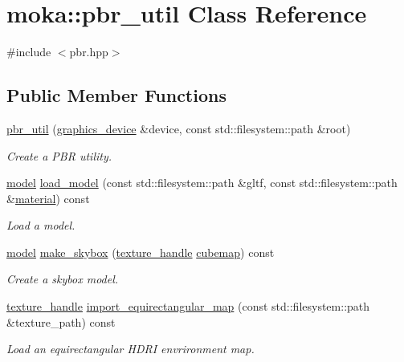 \hypertarget{classmoka_1_1pbr__util}{}\section{moka\+::pbr\+\_\+util Class Reference}
\label{classmoka_1_1pbr__util}


{\ttfamily \#include $<$pbr.\+hpp$>$}

\subsection*{Public Member Functions}
\begin{DoxyCompactItemize}
\item 
\mbox{\hyperlink{classmoka_1_1pbr__util_a2acd5e0c0e065f52e622d6e54cc6db65}{pbr\+\_\+util}} (\mbox{\hyperlink{classmoka_1_1graphics__device}{graphics\+\_\+device}} \&device, const std\+::filesystem\+::path \&root)
\begin{DoxyCompactList}\small\item\em Create a P\+BR utility. \end{DoxyCompactList}\item 
\mbox{\hyperlink{classmoka_1_1model}{model}} \mbox{\hyperlink{classmoka_1_1pbr__util_a6284a2bd80b2007a9bd057cf809998c5}{load\+\_\+model}} (const std\+::filesystem\+::path \&gltf, const std\+::filesystem\+::path \&\mbox{\hyperlink{classmoka_1_1material}{material}}) const
\begin{DoxyCompactList}\small\item\em Load a model. \end{DoxyCompactList}\item 
\mbox{\hyperlink{classmoka_1_1model}{model}} \mbox{\hyperlink{classmoka_1_1pbr__util_ae7e38f3efe0bc1b3f48e21b379d0750d}{make\+\_\+skybox}} (\mbox{\hyperlink{structmoka_1_1texture__handle}{texture\+\_\+handle}} \mbox{\hyperlink{namespacemoka_a259bf395c8f07bd8d13515efcb542623a63469dd37fd256264ad46c84e2ff6986}{cubemap}}) const
\begin{DoxyCompactList}\small\item\em Create a skybox model. \end{DoxyCompactList}\item 
\mbox{\hyperlink{structmoka_1_1texture__handle}{texture\+\_\+handle}} \mbox{\hyperlink{classmoka_1_1pbr__util_a108ca0e7337f7282e6928c133c0d2315}{import\+\_\+equirectangular\+\_\+map}} (const std\+::filesystem\+::path \&texture\+\_\+path) const
\begin{DoxyCompactList}\small\item\em Load an equirectangular H\+D\+RI envrironment map. \end{DoxyCompactList}\item 

\end{DoxyCompactItemize}
